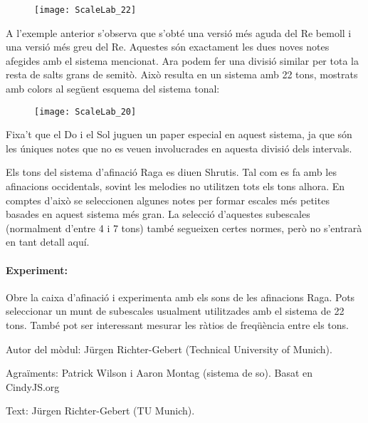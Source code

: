 \begin{figure}[h]
\centering
\texttt{[image: ScaleLab\_22]}
\end{figure}

A l'exemple anterior s'observa que s'obté una versió més aguda del Re bemoll i una versió més greu del Re. Aquestes són exactament les dues noves notes afegides amb el sistema mencionat. Ara podem fer una divisió similar per tota la resta de salts grans de semitò. Això resulta en un sistema amb 22 tons, mostrats amb colors al següent esquema del sistema tonal:

\begin{figure}[h]
\centering
\texttt{[image: ScaleLab\_20]}
\end{figure}


Fixa't que el Do i el Sol juguen un paper especial en aquest sistema, ja que són les úniques notes que no es veuen involucrades en aquesta divisió dels intervals.

Els tons del sistema d'afinació Raga es diuen Shrutis. Tal com es fa amb les afinacions occidentals, sovint les melodies no utilitzen tots els tons alhora. En comptes d'això se seleccionen algunes notes per formar escales més petites basades en aquest sistema més gran. La selecció d'aquestes subescales (normalment d'entre 4 i 7 tons) també segueixen certes normes, però no s'entrarà en tant detall aquí.

\paragraph{Experiment:}
Obre la caixa d'afinació i experimenta amb els sons de les afinacions Raga. Pots seleccionar un munt de subescales usualment utilitzades amb el sistema de 22 tons. També pot ser interessant mesurar les ràtios de freqüència entre els tons.

\begin{sectcredits}
\item[Autor del mòdul:] Jürgen Richter-Gebert (Technical University of Munich).

\item[Agraïments:] Patrick Wilson i Aaron Montag (sistema de so). Basat en CindyJS.org

\item[Text:] Jürgen Richter-Gebert (TU Munich).
\end{sectcredits}
